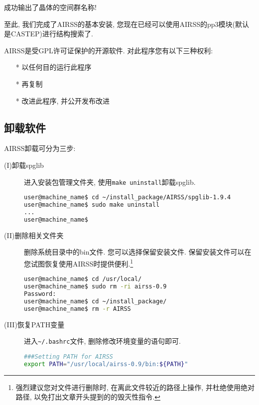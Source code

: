 \documentclass[a4paper, 10pt]{article}
\begin{document}
成功输出了晶体的空间群名称! 

至此, 我们完成了AIRSS的基本安装, 您现在已经可以使用AIRSS的pp3模块(默认是CASTEP)进行结构搜索了.

AIRSS是受GPL许可证保护的开源软件. 对此程序您有以下三种权利:
\begin{enumerate}
\item [*]以任何目的运行此程序
\item [*]再复制
\item [*]改进此程序, 并公开发布改进
\end{enumerate}

\subsection{卸载软件}
AIRSS卸载可分为三步:
\begin{description}
\item [(I)卸载spglib] 进入安装包管理文件夹, 使用\verb|make uninstall|卸载spglib.
\begin{lstlisting}[language={bash}]
user@machine_name$ cd ~/install_package/AIRSS/spglib-1.9.4
user@machine_name$ sudo make uninstall
...
user@machine_name$
\end{lstlisting}

\item [(II)删除相关文件夹] 删除系统目录中的bin文件. 您可以选择保留安装文件. 保留安装文件可以在您试图恢复使用AIRSS时提供便利.\footnote{强烈建议您对文件进行删除时, 在离此文件较近的路径上操作, 并杜绝使用绝对路径, 以免打出文章开头提到的的毁灭性指令.}
\begin{lstlisting}[language={bash}]
user@machine_name$ cd /usr/local/
user@machine_name$ sudo rm -ri airss-0.9 
Password:
user@machine_name$ cd ~/install_package/
user@machine_name$ rm -r AIRSS
\end{lstlisting}

\item [(III)恢复PATH变量] 进入\verb|~/.bashrc|文件, 删除修改环境变量的语句即可.
\begin{lstlisting}[language={bash}]
###Setting PATH for AIRSS
export PATH="/usr/local/airss-0.9/bin:${PATH}"
\end{lstlisting}
\end{description}
\end{document}
